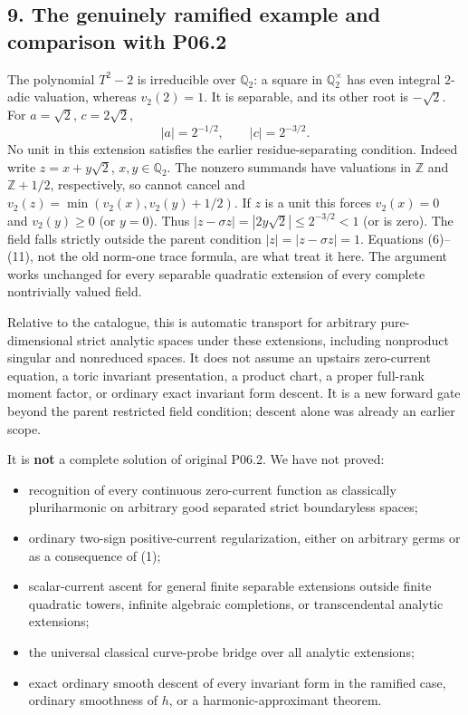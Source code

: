 \documentclass[
  11pt,
]{article}
\providecommand{\tightlist}{%
  \setlength{\itemsep}{0pt}\setlength{\parskip}{0pt}}
\begin{document}
\subsection{9. The genuinely ramified example and comparison with
P06.2}\label{the-genuinely-ramified-example-and-comparison-with-p06.2}

The polynomial \(T^2-2\) is irreducible over \(\mathbb Q_2\): a square
in \(\mathbb Q_2^\times\) has even integral \(2\)-adic valuation,
whereas \(v_2(2)=1\). It is separable, and its other root is
\(-\sqrt2\). For \(a=\sqrt2\), \(c=2\sqrt2\), \[
 |a|=2^{-1/2},\qquad |c|=2^{-3/2}.
\] No unit in this extension satisfies the earlier residue-separating
condition. Indeed write \(z=x+y\sqrt2\), \(x,y\in\mathbb Q_2\). The
nonzero summands have valuations in \(\mathbb Z\) and \(\mathbb Z+1/2\),
respectively, so cannot cancel and \(v_2(z)=\min(v_2(x),v_2(y)+1/2)\).
If \(z\) is a unit this forces \(v_2(x)=0\) and \(v_2(y)\geq0\) (or
\(y=0\)). Thus \(|z-\sigma z|=|2y\sqrt2|\leq2^{-3/2}<1\) (or is zero).
The field falls strictly outside the parent condition
\(|z|=|z-\sigma z|=1\). Equations (6)--(11), not the old norm-one trace
formula, are what treat it here. The argument works unchanged for every
separable quadratic extension of every complete nontrivially valued
field.

Relative to the catalogue, this is automatic transport for arbitrary
pure-dimensional strict analytic spaces under these extensions,
including nonproduct singular and nonreduced spaces. It does not assume
an upstairs zero-current equation, a toric invariant presentation, a
product chart, a proper full-rank moment factor, or ordinary exact
invariant form descent. It is a new forward gate beyond the parent
restricted field condition; descent alone was already an earlier scope.

It is \textbf{not} a complete solution of original P06.2. We have not
proved:

\begin{itemize}
\tightlist
\item
  recognition of every continuous zero-current function as classically
  pluriharmonic on arbitrary good separated strict boundaryless spaces;
\item
  ordinary two-sign positive-current regularization, either on arbitrary
  germs or as a consequence of (1);
\item
  scalar-current ascent for general finite separable extensions outside
  finite quadratic towers, infinite algebraic completions, or
  transcendental analytic extensions;
\item
  the universal classical curve-probe bridge over all analytic
  extensions;
\item
  exact ordinary smooth descent of every invariant form in the ramified
  case, ordinary smoothness of \(h\), or a harmonic-approximant theorem.
\end{itemize}
\end{document}
